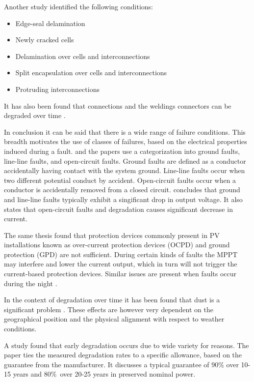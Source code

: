 Another study\cite{Forman1982} identified the following conditions:
\begin{itemize}
\item Edge-seal delamination
\item Newly cracked cells
\item Delamination over cells and interconnections
\item Split encapsulation over cells and interconnections
\item Protruding interconnections
\end{itemize}

It has also been found that connections and the weldings connectors can be degraded over time \cite{Houssein2010}.

In conclusion it can be said that there is a wide range of failure conditions.
This breadth motivates the use of classes of failures, based on the electrical properties induced during a fault.
\cite{Zhao2010thesis} and the papers \cite{Zhao2012tree,Zhao2013graph,Zhao2013outlier} use a categorization into ground faults, line-line faults, and open-circuit faults.
Ground faults are defined as a conductor accidentally having contact with the system ground\cite{Zhao2010thesis}.
Line-line faults occur when two different potential conduct by accident\cite{Zhao2010thesis}.
Open-circuit faults occur when a conductor is accidentally removed from a closed circuit\cite{Zhao2010thesis}.
\cite{Zhao2010thesis} concludes that ground and line-line faults typically exhibit a singificant drop in output voltage.
It also states that open-circuit faults and degradation causes significant decrease in current.

The same thesis found that protection devices commonly present in PV installations known as over-current protection devices (OCPD) and ground protection (GPD) are not sufficient.
During certain kinds of faults the MPPT may interfere and lower the current output, which in turn will not trigger the current-based protection devices.
Similar issues are present when faults occur during the night \cite{Zhao2010night}.

In the context of degradation over time it has been found that dust is a significant problem \cite{Mani2010}.
These effects are however very dependent on the geographical position and the physical alignment with respect to weather conditions.

A study \cite{Munoz2011} found that early degradation occurs due to wide variety for reasons.
The paper ties the measured degradation rates to a specific allowance, based on the guarantee from the manufacturer.
It discusses a typical guarantee of $90\%$ over 10-15 years and $80\%$ over 20-25 years in preserved nominal power.

